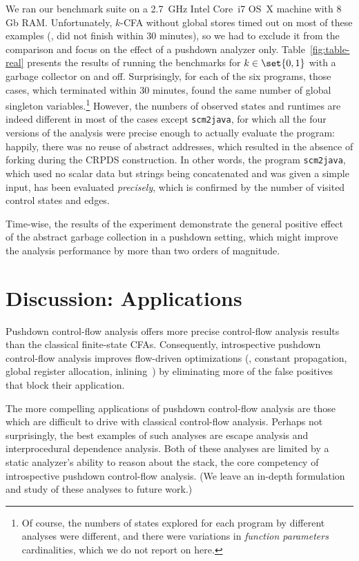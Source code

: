 We ran our benchmark suite on a 2.7~GHz Intel Core~i7 OS~X machine
with 8 Gb RAM. Unfortunately, $k$-CFA without global stores timed out
on most of these examples (\ie, did not finish within 30 minutes), so
we had to exclude it from the comparison and focus on the effect of a
pushdown analyzer only. Table~\ref{fig:table-real} presents the
results of running the benchmarks for $k \in \set{0,1}$ with a garbage
collector on and off. Surprisingly, for each of the six programs,
those cases, which terminated within 30 minutes, found the same number
of global singleton variables.\footnote{Of course, the numbers of
  states explored for each program by different analyses were
  different, and there were variations in \emph{function parameters}
  cardinalities, which we do not report on here.} However, the numbers
of observed states and runtimes are indeed different in most of the
cases except \texttt{scm2java}, for which all the four versions of the
analysis were precise enough to actually evaluate the program:
happily, there was no reuse of abstract addresses, which resulted in
the absence of forking during the CRPDS construction. In other words,
the program \texttt{scm2java}, which used no scalar data but strings
being concatenated and was given a simple input, has been evaluated
\emph{precisely}, which is confirmed by the number of visited control
states and edges.

Time-wise, the results of the experiment demonstrate the general
positive effect of the abstract garbage collection in a pushdown
setting, which might improve the analysis performance by more than two
orders of magnitude.


\section{Discussion: Applications}
\label{sec:applications}

Pushdown control-flow analysis offers more precise control-flow
analysis results than the classical finite-state CFAs.
Consequently, introspective pushdown control-flow analysis improves flow-driven
optimizations (\eg, constant propagation, global register allocation,
inlining~\cite{mattmight:Shivers:1991:CFA}) by eliminating more of
the false positives that block their application.

The more compelling applications of pushdown control-flow analysis
are those which are difficult to drive with classical control-flow
analysis.
Perhaps not surprisingly, the best examples of such analyses are
escape analysis and interprocedural dependence analysis.
Both of these analyses are limited by a static analyzer's ability to
reason about the stack, the core competency of introspective pushdown control-flow
analysis.
(We leave an in-depth formulation and study of these
analyses to future work.)


